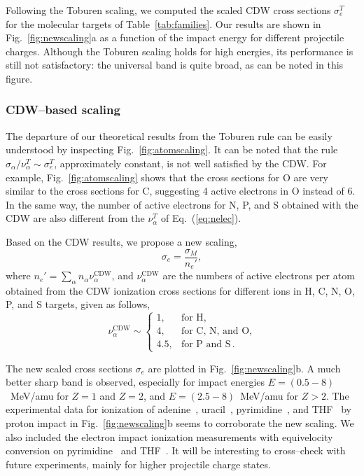 \documentclass[preprint,showpacs]{revtex4}
\begin{document}
Following the Toburen scaling, we computed the scaled CDW cross sections 
$\sigma_{e}^T$ for the molecular targets of Table~\ref{tab:families}.
Our results are shown in Fig.~\ref{fig:newscaling}a as a function of 
the impact energy for different projectile charges. Although the 
Toburen scaling holds for high energies, its performance is still not 
satisfactory: the universal band is quite broad, as can be noted in 
this figure.

\subsubsection{CDW--based scaling}

The departure of our theoretical 
results from the Toburen rule can be easily understood 
by inspecting Fig.~\ref{fig:atomscaling}. It can be noted that the 
rule $\sigma_{\alpha}/\nu_{\alpha}^T\sim \sigma_{e}^T$, approximately 
constant, is not well satisfied by the CDW. 
For example, Fig.~\ref{fig:atomscaling} shows that the cross sections
for O are very similar to the cross sections for C, suggesting 
4 active electrons in O instead of 6. In the same way, the number of
active electrons for N, P, and S obtained with the CDW are also 
different from the $\nu_{\alpha}^T$ of Eq.~(\ref{eq:nelec}). 

Based on the CDW results, we propose a new scaling,
\begin{equation}
\sigma_{e}=\frac{\sigma_M}{n_e'},
\label{32} 
\end{equation}
where $n_e'=\sum_{\alpha}n_{\alpha}\nu_{\alpha}^{\text{CDW}}$, and 
$\nu_{\alpha}^{\text{CDW}}$ are the numbers of active electrons
per atom obtained from the CDW ionization cross sections for 
different ions in H, C, N, O, P, and S targets, given as follows,
\begin{equation}
\nu_{\alpha }^{\text{CDW}} \sim\left\{ 
\begin{array}{ll}
1, & \text{for H,} \\
4, & \text{for C, N, and O,} \\ 
4.5, & \text{for P and S}\,.
\end{array}
\right. 
\label{eq:scalingCDW}
\end{equation}

The new scaled cross sections $\sigma_{e}$ are plotted in 
Fig.~\ref{fig:newscaling}b. 
A much better sharp band is observed, especially for impact energies 
$E=(0.5-8)$~MeV/amu for $Z=1$ and $Z=2$, and $E=(2.5-8)$~MeV/amu for 
$Z>2$. The experimental data for ionization of 
adenine~\cite{iriki2011}, uracil~\cite{itoh2013}, 
pyrimidine~\cite{wolff2014}, and THF~\cite{wang2016} by proton impact in
Fig.~\ref{fig:newscaling}b seems to corroborate the new scaling. 
We also included the electron impact ionization measurements with 
equivelocity conversion on pyrimidine~\cite{bug2017} and 
THF~\cite{bug2017,wolf2019,fuss2009}. 
It will be interesting to cross--check with future experiments, mainly 
for higher projectile charge states. 
\end{document}
